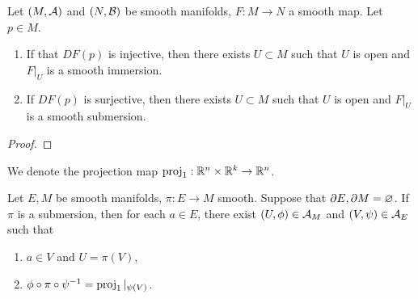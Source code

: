 \documentclass{book}
\begin{document}
	\begin{ex} 
		Let $(M, \mathcal{A})$ and $(N, \mathcal{B})$ be smooth manifolds, $F: M \rightarrow N$ a smooth map. Let $p \in M$.
		\begin{enumerate}
			\item If that $DF(p)$ is injective, then there exists $U \subset M$ such that $U$ is open and $F|_U$ is a smooth immersion.
			\item If $DF(p)$ is surjective, then there exists $U \subset M$ such that $U$ is open and $F|_U$ is a smooth submersion.
		\end{enumerate}
	\end{ex}

	\begin{proof}
	\end{proof}	

	\begin{note}
		We denote the projection map $\operatorname{\text{proj}}_1: \mathbb{R}^n \times \mathbb{R}^k \rightarrow \mathbb{R}^n$.
	\end{note}

	\begin{ex} 
		Let $E, M$ be smooth manifolds, $\pi:E \rightarrow M$ smooth. Suppose that $\partial E, \partial M = \varnothing$. If $\pi$ is a submersion, then for each $a \in E$, there exist $(U, \phi) \in \mathcal{A}_M$ and $(V, \psi) \in \mathcal{A}_E$ such that 
		\begin{enumerate}
			\item $a \in V$ and $U = \pi(V)$,
			\item $\phi \circ \pi \circ \psi^{-1} = \operatorname{\text{proj}}_1|_{\psi(V)}$. 
		\end{enumerate}
	\end{ex}
\end{document}
